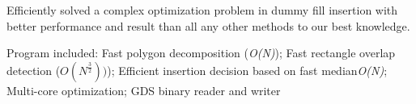 \begin{cventry}
  \item Efficiently solved a complex optimization problem in dummy fill insertion with better performance and result than all any other methods to our best knowledge.
  \item Program included: Fast polygon decomposition (\textit{O(N)}); Fast rectangle overlap detection (\textit{$O(N^{\frac{3}{2}}))$}); Efficient insertion decision based on fast median\textit{O(N)}; Multi-core optimization; GDS binary reader and writer
\end{cventry}
